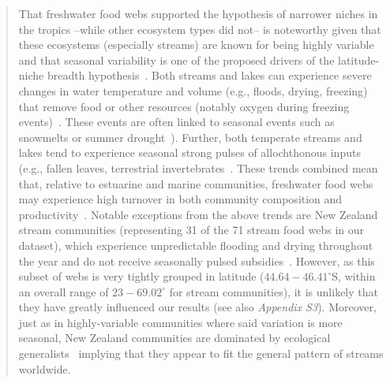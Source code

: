 \documentclass[12pt]{letter}
\begin{document}
  \begin{quotation}

    That freshwater food webs supported the hypothesis of 
    narrower niches in the tropics --while other ecosystem 
    types did not-- is noteworthy given that these
    ecosystems (especially streams) are known for being 
    highly variable and that seasonal variability is one of 
    the proposed drivers of the latitude-niche breadth 
    hypothesis~\cite{Vazquez2004}. Both streams and lakes
    can experience severe changes in water temperature and 
    volume (e.g., floods, drying, freezing) that remove 
    food or other resources (notably oxygen during
    freezing events)~\cite{Winterbourn1997,Meding2001}. 
    These events are often linked to seasonal events such 
    as snowmelts or summer drought~\cite{Winterbourn1997}). 
    Further, both temperate streams and lakes tend to 
    experience seasonal strong pulses of allochthonous 
    inputs (e.g., fallen leaves, terrestrial
    invertebrates~\cite{Nakano2001,Lennon2004,Zeng2008}. 
    These trends combined mean that, relative to estuarine 
    and marine communities, freshwater food webs may 
    experience high turnover in both community composition 
    and productivity~\cite{Tilzer1988,Magalhaes1993,Baird1989}. Notable exceptions from the above
    trends are New Zealand stream communities (representing 
    31 of the 71 stream food webs in our dataset), which 
    experience unpredictable flooding and drying throughout 
    the year and do not receive seasonally pulsed
    subsidies~\cite{Winterbourn1997,Winterbourn1981}. 
    However, as this subset of webs is very tightly grouped 
    in latitude ($44.64-46.41^{\circ}$S, within an
    overall range of $23-69.02^{\circ}$ for stream 
    communities), it is unlikely that they have greatly
    influenced our results (see also \emph{Appendix S3}). 
    Moreover, just as in highly-variable communities where 
    said variation is more seasonal, New Zealand 
    communities are dominated by ecological
    generalists~\cite{Winterbourn1997,Winterbourn1981} 
    implying that they appear to fit the general pattern of 
    streams worldwide.



\end{quotation}
\end{document}
